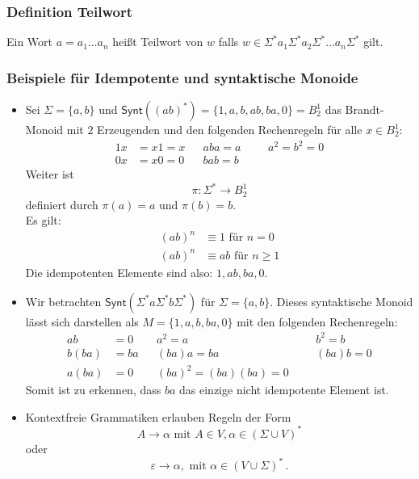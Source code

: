 \documentclass[12pt, german]{article}
\newcommand{\sigstern}{\Sigma^\ast}
\newcommand{\synt}{\mathsf{Synt}}
\begin{document}
	\subsubsection{Definition Teilwort}
	Ein Wort $a = a_1 \ldots a_n$ hei\ss t Teilwort von $w$ falls $w \in \sigstern a_1 \sigstern a_2 \sigstern \ldots a_n\sigstern$ gilt.
	
	\subsubsection{Beispiele für Idempotente und syntaktische Monoide} 
	\begin{itemize}
		\item Sei $\Sigma = \{a, b\}$ und $\synt((ab)^\ast) = \{1, a ,b , ab, ba, 0\} = B^1_2$ das Brandt-Monoid mit $2$ Erzeugenden und den folgenden Rechenregeln für alle $x \in B^1_2$: 
		\begin{align*}
			1x &= x1 = x   &&aba = a  &&&a^2=b^2 = 0\\
			0x &= x0 = 0   &&bab = b 
		\end{align*}
		Weiter ist $$\pi: \sigstern \to B^1_2$$ definiert durch $\pi(a) = a$ und $\pi(b) = b$. \\
		Es gilt:
		\begin{align*}
			(ab)^n &\equiv 1 \text{ für } n = 0 \\
			(ab)^n &\equiv ab \text{ für } n \geq 1 
		\end{align*} Die idempotenten Elemente sind also: $1, ab ,ba, 0$.
		\item Wir betrachten $\mathsf{Synt}(\Sigma^*a\Sigma^*b\Sigma^*)$ für $\Sigma= \{a,b\}$. Dieses syntaktische Monoid lässt sich darstellen als $M = \{1, a, b, ba, 0\}$ mit den folgenden Rechenregeln: 
		\begin{align*}
			ab &= 0    && a^2 = a &&&b^2 = b \\
			b(ba) &= ba   &&(ba)a = ba &&& (ba)b = 0 \\
			a(ba) &= 0  &&(ba)^2 = (ba)(ba) = 0
		\end{align*}
		Somit ist zu erkennen, dass $ba$ das einzige nicht idempotente Element ist. 
		\item Kontextfreie Grammatiken erlauben Regeln der Form $$A \to \alpha \text{ mit } A \in V, \alpha \in (\Sigma \cup V)^\ast$$ oder $$\varepsilon \to \alpha, \text{ mit } \alpha \in (V \cup \Sigma)^\ast\, .$$ 
		

\end{itemize}
\end{document}
